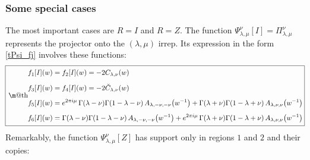 \documentclass[12pt]{article}
\makeatletter
\newcommand*{\wideboxed}[1]{\setlength{\fboxsep}{1ex}%
  \fbox{\m@th$\displaystyle#1$}}
\newcommand{\bA}{\breve{A}}
\newcommand{\bC}{\breve{C}}
\makeatother
\begin{document}
\subsubsection{Some special cases}

The most important cases are $R=I$ and $R=Z$. The function $\Psi^{\nu}_{\lambda,\mu}[I]=\Pi^{\nu}_{\lambda,\mu}$ represents the projector onto the $(\lambda,\mu)$ irrep. Its expression in the form \eqref{tPsi_fj} involves these functions:
\begin{equation}
\!\wideboxed{
\begin{aligned}
f_{1}[I](w)&=f_{2}[I](w)=-2C_{\lambda,\nu}(w)
\\[5pt]
f_{3}[I](w)&=f_{4}[I](w)=-2\bC_{\lambda,\nu}(w)
\\[5pt]
f_{5}[I](w)&= e^{2\pi i\mu}\,
\Gamma(\lambda-\nu)\Gamma(1-\lambda-\nu)\,
A_{\lambda,-\nu,-\nu}\bigl(w^{-1}\bigr)
+\Gamma(\lambda+\nu)\Gamma(1-\lambda+\nu)\,
A_{\lambda,\nu,\nu}\bigl(w^{-1}\bigr)
\\[5pt]
f_{6}[I](w)&=\Gamma(\lambda-\nu)\Gamma(1-\lambda-\nu)\,
A_{\lambda,-\nu,-\nu}\big(w^{-1}\big)
+e^{2\pi i\mu}\,\Gamma(\lambda+\nu)\Gamma(1-\lambda+\nu)\,
A_{\lambda,\nu,\nu}\big(w^{-1}\big)
\end{aligned}\!
}\!
\end{equation}
Remarkably, the function $\Psi^{\nu}_{\lambda,\mu}[Z]$ has support only in regions $1$ and $2$ and their copies:
\end{document}
